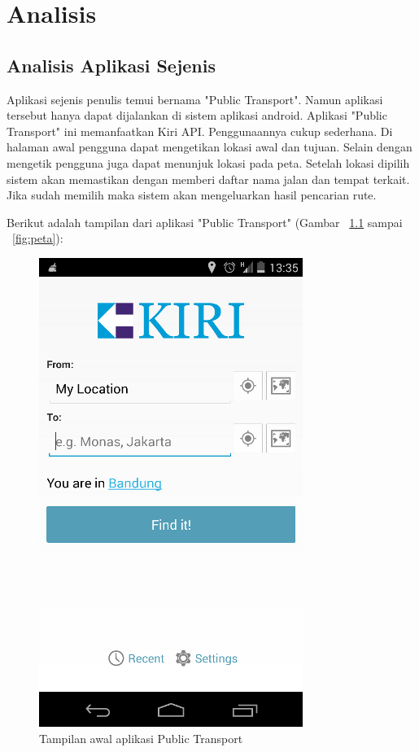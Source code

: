 \chapter{Analisis}
\label{chap:analisi}

\section{Analisis Aplikasi Sejenis}
\label{lab:Analisis Aplikasi Sejenis}
\hspace{0.5cm} Aplikasi sejenis penulis temui bernama "Public Transport"\footnotemark[1]. Namun aplikasi tersebut hanya dapat dijalankan di sistem aplikasi android. Aplikasi "Public Transport" ini memanfaatkan Kiri API. Penggunaannya cukup sederhana. Di halaman awal pengguna dapat mengetikan lokasi awal dan tujuan. Selain dengan mengetik pengguna juga dapat menunjuk lokasi pada peta. Setelah lokasi dipilih sistem akan memastikan dengan memberi daftar nama jalan dan tempat terkait. Jika sudah memilih maka sistem akan mengeluarkan hasil pencarian rute.

Berikut adalah tampilan dari aplikasi "Public Transport" (Gambar ~\ref{fig:home} sampai ~\ref{fig:peta}):

\begin{figure}[h]
	\centering
		\includegraphics[scale=0.5]{Gambar/KIRI_Android/home}
	\caption{Tampilan awal aplikasi Public Transport}
	\label{fig:home}
\end{figure}

